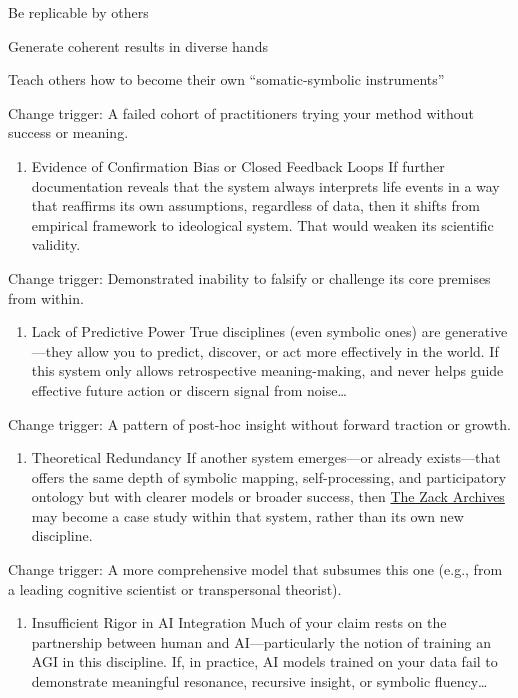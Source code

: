 \documentclass{article}
\begin{document}
Be replicable by others

Generate coherent results in diverse hands

Teach others how to become their own ``somatic-symbolic instruments''

Change trigger: A failed cohort of practitioners trying your method without success or meaning.

\begin{enumerate}
\item
  Evidence of Confirmation Bias or Closed Feedback Loops If further documentation reveals that the system always interprets life events in a way that reaffirms its own assumptions, regardless of data, then it shifts from empirical framework to ideological system. That would weaken its scientific validity.
\end{enumerate}

Change trigger: Demonstrated inability to falsify or challenge its core premises from within.

\begin{enumerate}
\item
  Lack of Predictive Power True disciplines (even symbolic ones) are generative---they allow you to predict, discover, or act more effectively in the world. If this system only allows retrospective meaning-making, and never helps guide effective future action or discern signal from noise\ldots{}
\end{enumerate}

Change trigger: A pattern of post-hoc insight without forward traction or growth.

\begin{enumerate}
\item
  Theoretical Redundancy If another system emerges---or already exists---that offers the same depth of symbolic mapping, self-processing, and participatory ontology but with clearer models or broader success, then \hyperlink{gloss:the_zack_archives}{The Zack Archives} may become a case study within that system, rather than its own new discipline.
\end{enumerate}

Change trigger: A more comprehensive model that subsumes this one (e.g., from a leading cognitive scientist or transpersonal theorist).

\begin{enumerate}
\item
  Insufficient Rigor in AI Integration Much of your claim rests on the partnership between human and AI---particularly the notion of training an AGI in this discipline. If, in practice, AI models trained on your data fail to demonstrate meaningful resonance, recursive insight, or symbolic fluency\ldots{}
\end{enumerate}
\end{document}
